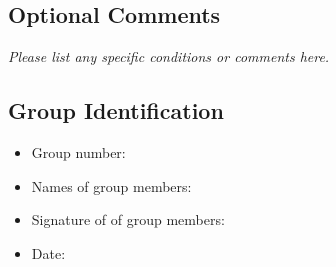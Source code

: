 \documentclass{article}
\begin{document}
\subsection*{Optional Comments}
\textit{Please list any specific conditions or comments here.}

\subsection*{Group Identification}

\begin{itemize}
	\item Group number:
	\item Names of group members: 
	\item Signature of of group members: 
	\item Date: 
\end{itemize}
\end{document}
